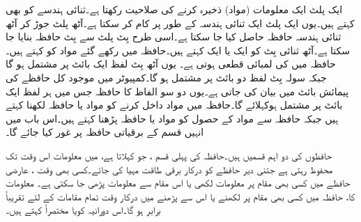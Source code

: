 ایک پلٹ ایک معلومات (مواد)  ذخیرہ کرنے کی صلاحیت رکھتا ہے۔ثنائی ہندسے کو   بھی  کہتے ہیں۔یوں ایک پلٹ ایک ثنائی ہندسہ   کے طور  پر کام کر سکتا ہے۔آٹھ پلٹ جوڑ کر آٹھ ثنائی ہندسہ حافظہ حاصل کیا جا سکتا ہے۔اسی طرح    بِٹ پلٹ سے     بِٹ حافظہ بنایا جا سکتا ہے۔آٹھ ثنائی  بِٹ کو ایک  یا ایک  کہتے ہیں۔حافظہ میں رکھے  گئے   مواد کو کہتے ہیں۔حافظہ میں  کی لمبائی قطعی ہوتی ہے۔ یوں آٹھ بِٹ لفظ ایک بائٹ پر مشتمل ہو گا جبکہ سولہ بِٹ لفظ دو بائٹ پر مشتمل ہو گا۔کمپیوٹر میں موجود کل  حافظے  کی  پیمائش  بائٹ میں بیان کی جاتی ہے۔یوں  دو سو الفاظ کا حافظہ  جس میں ہر لفظ ایک بائٹ پر مشتمل ہوکہلائے گا۔حافظہ میں مواد داخل کرنے کو مواد یا حافظہ لکھنا کہتے ہیں جبکہ  حافظہ  سے مواد کے حصول کو مواد   یا   حافظہ پڑھنا کہتے ہیں۔اس باب میں انہیں قسم کے  برقیاتی  حافظہ پر غور کیا جائے گا۔


حافظوں کی دو اہم  قسمیں ہیں۔حافظہ کی پہلی قسم ، جو  کہلاتا ہے، میں معلومات اس وقت تک محفوظ رہتی ہے جتنی دیر حافظے کو درکار برقی طاقت مہیا کی جائے۔کسی بھی وقت   ،  عارضی حافظے میں کسی بھی   مقام پر  معلومات   لکھی  یا اس مقام سے  معلومات پڑھی جا سکتی ہے۔ معلومات کا، حافظہ میں کسی بھی مقام پر لکھنے یا اس سے پڑھنے میں درکار وقت تمام  مقامات کے لئے تقریباً برابر ہو گا۔اس دورانیہ کویا  مختصراً   کہتے ہیں۔


